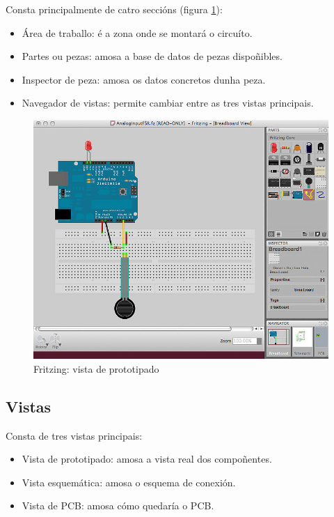  Consta principalmente de catro seccións (figura \ref{figura:FritzingBB}):

 \begin{itemize}
  \item Área de traballo: é a zona onde se montará o circuíto.
  \item Partes ou pezas: amosa a base de datos de pezas dispoñibles.
  \item Inspector de peza: amosa os datos concretos dunha peza.
  \item Navegador de vistas: permite cambiar entre as tres vistas principais.
 \end{itemize}

 \begin{figure}[htbp]
  \centering
  \includegraphics[scale=0.3,keepaspectratio=true]{./imagenes/fritzing-bb.jpg}
  \caption{Fritzing: vista de prototipado}
  \label{figura:FritzingBB}
 \end{figure}

 \subsection{Vistas}

 Consta de tres vistas principais:

 \begin{itemize}
  \item Vista de prototipado: amosa a vista real dos compoñentes.
  \item Vista esquemática: amosa o esquema de conexión.
  \item Vista de PCB: amosa cómo quedaría o PCB.
 \end{itemize}

